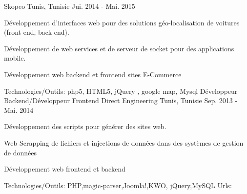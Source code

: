 \begin{cventries}
    {Skopeo}
    {Tunis, Tunisie}
    {Jui. 2014 - Mai. 2015}
    {
      \begin{cvitems}
        \item {Développement d'interfaces web pour des solutions géo-localisation de voitures (front end, back end).}
        \item {Développement de web services et de serveur de socket pour des applications mobile.}
        \item {Développement web backend et frontend sites E-Commerce}
      \end{cvitems}
    }
    {\textcolor{awesome}{Technologies/Outils: } {\color{graytext}}  {php5, HTML5, jQuery , google map, Mysql}}   
    {} 
    {
    }    	
  \techentries
    {Développeur Backend/Développeur Frontend}
    {Direct Engineering}
    {Tunis, Tunisie}
    {Sep. 2013 - Mai. 2014}
    {
      \begin{cvitems}
        \item {Développement des scripts pour générer des sites web.}
        \item {Web Scrapping de fichiers et injections de données dans des systèmes de gestion de données}
        \item {Développement web frontend et backend}
      \end{cvitems}
    }
    {\textcolor{awesome}{Technologies/Outils: } {\color{graytext}}  {PHP,magic-parser,Joomla!,KWO, jQuery,MySQL}}
    {Urls:} 
    {\href{http://www.pure-jobs.com/}{} \break
    }       
\end{cventries}

